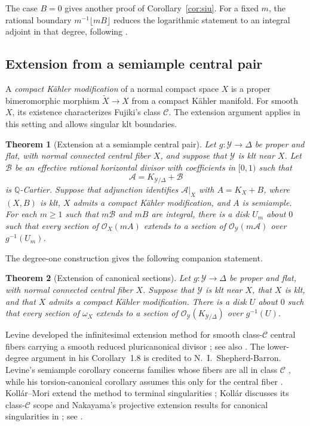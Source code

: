 \documentclass[11pt,a4paper]{article}
\numberwithin{equation}{section}
\newtheorem{maintheorem}{Theorem}
\theoremstyle{definition}
\theoremstyle{remark}
\newcommand{\OO}{\mathcal O}\newcommand{\cX}{\mathcal X}
\begin{document}
The case $B=0$ gives another proof of Corollary~\ref{cor:siu}.
For a fixed $m$, the rational boundary $m^{-1}\lfloor mB\rfloor$
reduces the logarithmic statement to an integral adjoint in that
degree, following \cite[proof of Theorem~4.2]{HMX2018}.

\subsection{Extension from a semiample central pair}

A \emph{compact Kähler modification} of a normal compact space $X$
is a proper bimeromorphic morphism $\widetilde X\to X$ from a
compact Kähler manifold. For smooth $X$, its existence characterizes
Fujiki's class $\mathcal C$. The extension argument applies in this
setting and allows singular klt boundaries.

\begin{maintheorem}[Extension at a semiample central pair]\label{thm:endpoint}
Let $g:\mathcal Y\to\Delta$ be proper and flat, with normal connected
central fiber $X$, and suppose that $\mathcal Y$ is klt near $X$.
Let $\mathcal B$ be an effective rational horizontal divisor with
coefficients in $[0,1)$ such that
\[
 \mathcal A=K_{\mathcal Y/\Delta}+\mathcal B
\]
is $\mathbb Q$-Cartier. Suppose that adjunction identifies
$\mathcal A|_X$ with $A=K_X+B$, where $(X,B)$ is klt, $X$ admits a
compact Kähler modification, and $A$ is semiample. For each $m\ge1$
such that $m\mathcal B$ and $mB$ are integral, there is a disk $U_m$
about $0$ such that every section of $\OO_X(mA)$ extends to a
section of $\OO_{\mathcal Y}(m\mathcal A)$ over $g^{-1}(U_m)$.
\end{maintheorem}

The degree-one construction gives the following companion statement.

\begin{maintheorem}[Extension of canonical sections]\label{thm:degreeone}
Let $g:\mathcal Y\to\Delta$ be proper and flat, with normal connected
central fiber $X$. Suppose that $\mathcal Y$ is klt near $X$, that
$X$ is klt, and that $X$ admits a compact Kähler modification.
There is a disk $U$ about $0$ such that every section of $\omega_X$
extends to a section of $\OO_{\mathcal Y}(K_{\mathcal Y/\Delta})$
over $g^{-1}(U)$.
\end{maintheorem}

Levine developed the infinitesimal extension method for smooth
class-$\mathcal C$ central fibers carrying a smooth reduced
pluricanonical divisor \cite[Proposition~1.6 and Corollary~1.8]{Levine1983};
see also \cite{Levine1985}. The lower-degree argument in his
Corollary~1.8 is credited to N.~I.~Shepherd-Barron. Levine's
semiample corollary concerns families whose fibers are all in
class $\mathcal C$ \cite[Corollary~1.10]{Levine1983}, while his
torsion-canonical corollary assumes this only for the central fiber
\cite[Corollary~1.11]{Levine1983}. Kollár--Mori extend the method
to terminal singularities \cite[Theorem~12.5.5]{KM1992};
Kollár discusses its class-$\mathcal C$ scope and Nakayama's
projective extension results for canonical singularities in
\cite[Comments following Conjecture~17]{Kollar2021}; see
\cite[VI.3.15--16]{Nakayama2004}.
\end{document}
